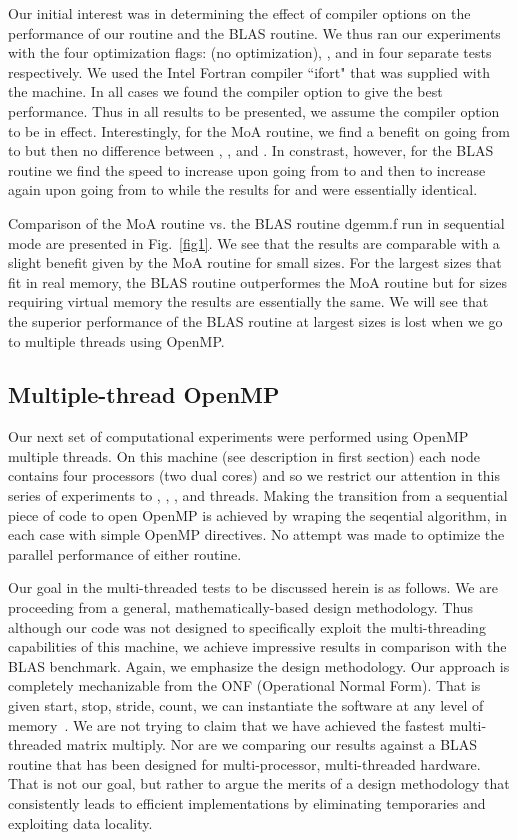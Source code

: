 \documentclass[aps,prl,twocolumn,groupedaddress,floatfix]{revtex4}
\begin{document}
Our initial interest was in determining the effect of
compiler options on the performance of our routine and the BLAS routine.  We 
thus ran our experiments with the four optimization flags: 
 (no optimization), ,  and  in four separate tests 
respectively.  We used the Intel Fortran compiler ``ifort" that was supplied
with the machine.  In all cases we found the compiler option  to give 
the best performance.  Thus in all results to be presented, we assume the
compiler option  to be in effect.  Interestingly, for the MoA routine,
we find a benefit on going from  to  but then no difference between
, , and . In constrast, however, for the BLAS routine we find
the speed to increase upon going from  to  and then to increase
again upon going from  to  while the results for  and 
 were essentially identical.

Comparison of the MoA routine vs. the BLAS routine dgemm.f run in sequential
mode are presented in Fig.~\ref{fig1}.  We see that the results are 
comparable with a slight benefit given by the MoA routine for small sizes.
For the largest sizes that fit in real memory, the BLAS routine outperformes
the MoA routine but for sizes requiring virtual memory the results are
essentially the same.  We will see that the superior performance of the 
BLAS routine at largest sizes is lost when we go to multiple threads 
using OpenMP.

\subsection{Multiple-thread OpenMP}

Our next set of computational experiments were performed using OpenMP
multiple threads.  On this machine (see description in first section)
each node contains four processors (two dual cores) and so we 
restrict our attention in 
this series of experiments to , , , and  threads.  Making
the transition from a sequential piece of code to open OpenMP is achieved
by wraping the seqential algorithm, in each case with simple OpenMP directives.
No attempt was made to optimize the parallel performance of either routine.

Our goal in the multi-threaded tests to be discussed herein is as follows.
We are proceeding from a general, mathematically-based design methodology.  
Thus although our code was not designed to specifically exploit the 
multi-threading capabilities of this machine, we achieve impressive results
in comparison with the BLAS benchmark.  Again, we emphasize the design
methodology. Our approach is completely mechanizable from the ONF (Operational
Normal Form). That is given start, stop, stride, count, we can
instantiate the software at any 
level of memory~\cite{rmhr,mullin-raynolds-book,Mul03,mul91,cpc}.  We are not trying to claim that we have achieved the fastest
multi-threaded matrix multiply.  Nor are we comparing our results against
a BLAS routine that has been designed for multi-processor, multi-threaded
hardware.  That is not our goal, but rather to argue the merits of a
design methodology that consistently leads to efficient implementations 
by eliminating temporaries and exploiting data locality.
\end{document}
